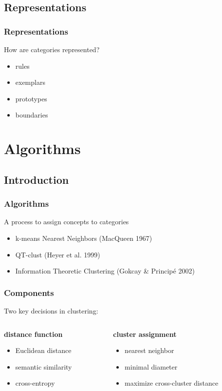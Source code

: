 \documentclass{beamer}
\begin{document}
\subsection{Representations}
\begin{frame}
\frametitle{Representations}
How are categories represented?

\begin{itemize}
  \item{rules}
  \pause
  \item{exemplars}
  \pause
  \item{prototypes}
  \pause
  \item{boundaries}
\end{itemize}
\end{frame}

\section{Algorithms}
\subsection{Introduction}
\begin{frame}
\frametitle{Algorithms}
A process to assign concepts to categories\\

\pause

\begin{itemize}
  \item{k-means Nearest Neighbors \tiny{(MacQueen 1967)}}
  \item{QT-clust \tiny{(Heyer et al. 1999)}}
  \item{Information Theoretic Clustering \tiny{(Gokcay \& Princip\'{e} 2002)}}
\end{itemize}
\end{frame}

\begin{frame}
\frametitle{Components}
Two key decisions in clustering:
\begin{columns}
\begin{column}{.5\textwidth}
\textbf{distance function}
\begin{itemize}
  \item Euclidean distance
  \item semantic similarity
  \item cross-entropy
\end{itemize}
\end{column}
\begin{column}{.5\textwidth}
\textbf{cluster assignment}
\begin{itemize}
  \item nearest neighbor
  \item minimal diameter
  \item maximize cross-cluster distance
\end{itemize}
\end{column}
\end{columns}
\end{frame}
\end{document}
